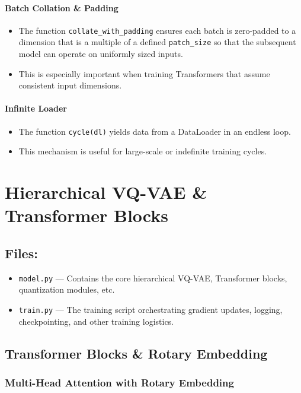 \documentclass[11pt]{article}
\begin{document}
\paragraph{Batch Collation \& Padding}
\begin{itemize}
  \item The function \texttt{collate\_with\_padding} ensures each batch is zero-padded to a dimension that is a multiple of a defined \texttt{patch\_size} so that the subsequent model can operate on uniformly sized inputs.
  \item This is especially important when training Transformers that assume consistent input dimensions.
\end{itemize}

\paragraph{Infinite Loader}
\begin{itemize}
  \item The function \texttt{cycle(dl)} yields data from a DataLoader in an endless loop.
  \item This mechanism is useful for large-scale or indefinite training cycles.
\end{itemize}

\section{Hierarchical VQ-VAE \& Transformer Blocks}

\subsection*{Files:}
\begin{itemize}
  \item \texttt{model.py} --- Contains the core hierarchical VQ-VAE, Transformer blocks, quantization modules, etc.
  \item \texttt{train.py} --- The training script orchestrating gradient updates, logging, checkpointing, and other training logistics.
\end{itemize}

\subsection{Transformer Blocks \& Rotary Embedding}

\subsubsection*{Multi-Head Attention with Rotary Embedding}
\end{document}
